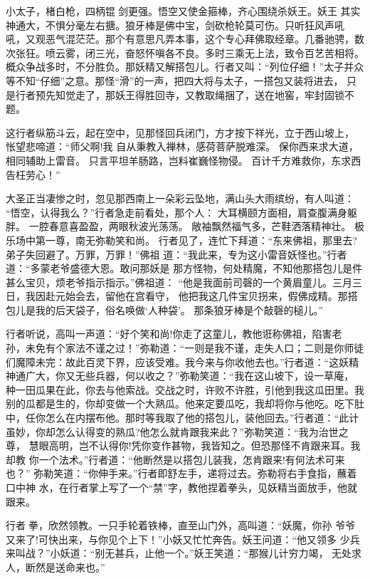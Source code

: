 小太子，楮白枪，四柄锟剑更强。悟空又使金箍棒，齐心围绕杀妖王。妖王
其实神通大，不惧分毫左右搪。狼牙棒是佛中宝，剑砍枪轮莫可伤。只听狂风声吼
吼，又观恶气混茫茫。那个有意思凡弄本事，这个专心拜佛取经章。几番驰骋，数
次张狂。喷云雾，闭三光，奋怒怀嗔各不良。多时三乘无上法，致令百艺苦相将。
概众争战多时，不分胜负。那妖精又解搭包儿。行者又叫：“列位仔细！”太子并众
等不知“仔细”之意。那怪“滑”的一声，把四大将与太子，一搭包又装将进去，
只是行者预先知觉走了，那妖王得胜回寺，又教取绳捆了，送在地窖，牢封固锁不
题。

这行者纵筋斗云，起在空中，见那怪回兵闭门，方才按下祥光，立于西山坡上，
怅望悲啼道：“师父啊!我
自从秉教入禅林，感荷菩萨脱难深。
保你西来求大道，相同辅助上雷音。
只言平坦羊肠路，岂料崔巍怪物侵。
百计千方难救你，东求西告枉劳心！”

大圣正当凄惨之时，忽见那西南上一朵彩云坠地，满山头大雨缤纷，有人叫道：
“悟空，认得我么？”行者急走前看处，那个人：
大耳横颐方面相，肩查腹满身躯胖。
一腔春意喜盈盈，两眼秋波光荡荡。
敞袖飘然福气多，芒鞋洒落精神壮。
极乐场中第一尊，南无弥勒笑和尚。
行者见了，连忙下拜道：“东来佛祖，那里去?弟子失回避了。万罪，万罪！”佛祖
道：“我此来，专为这小雷音妖怪也。”行者道：“多蒙老爷盛德大恩。敢问那妖是
那方怪物，何处精魔，不知他那搭包儿是件甚么宝贝，烦老爷指示指示。”佛祖道：
“他是我面前司磬的一个黄眉童儿。三月三日，我因赴元始会去，留他在宫看守，
他把我这几件宝贝拐来，假佛成精。那搭包儿是我的后天袋子，俗名唤做‘人种袋’。
那条狼牙棒是个敲磬的槌儿。”

行者听说，高叫一声道：“好个笑和尚!你走了这童儿，教他诳称佛祖，陷害老
孙，未免有个家法不谨之过！”弥勒道：“一则是我不谨，走失人口；二则是你师徒
们魔障未完：故此百灵下界，应该受难。我今来与你收他去也。”行者道：“这妖精
神通广大，你又无些兵器，何以收之？”弥勒笑道：“我在这山坡下，设一草庵，
种一田瓜果在此，你去与他索战。交战之时，许败不许胜，引他到我这瓜田里。我
别的瓜都是生的，你却变做一个大熟瓜。他来定要瓜吃，我却将你与他吃。吃下肚
中，任你怎么在内摆布他。那时等我取了他的搭包儿，装他回去。”行者道：“此计
虽妙，你却怎么认得变的熟瓜?他怎么就肯跟我来此？”弥勒笑道：“我为治世之尊，
慧眼高明，岂不认得你!凭你变作甚物，我皆知之。但恐那怪不肯跟来耳。我却教
你一个法术。”行者道：“他断然是以搭包儿装我，怎肯跟来!有何法术可来也？”
弥勒笑道：“你伸手来。”行者即舒左手，递将过去。弥勒将右手食指，蘸着口中神
水，在行者掌上写了一个“禁”字，教他捏着拳头，见妖精当面放手，他就跟来。

行者拳，欣然领教。一只手轮着铁棒，直至山门外，高叫道：“妖魔，你孙
爷爷又来了!可快出来，与你见个上下！”小妖又忙忙奔告。妖王问道：“他又领多
少兵来叫战？”小妖道：“别无甚兵，止他一个。”妖王笑道：“那猴儿计穷力竭，
无处求人，断然是送命来也。”

